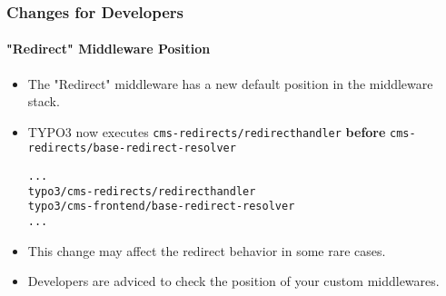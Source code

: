 %

\begin{frame}[fragile]
	\frametitle{Changes for Developers}
	\framesubtitle{"Redirect" Middleware Position}


	\begin{itemize}
		\item The "Redirect" middleware has a new default position in the middleware stack.
		\item TYPO3 now executes
			\small\texttt{cms-redirects/redirecthandler}\normalsize
			\textbf{before}
			\texttt{cms-redirects/base-redirect-resolver}\normalsize
\begin{lstlisting}
...
typo3/cms-redirects/redirecthandler
typo3/cms-frontend/base-redirect-resolver
...
\end{lstlisting}

		\item This change may affect the redirect behavior in some rare cases.
		\item Developers are adviced to check the position of your custom middlewares.

	\end{itemize}

\end{frame}

